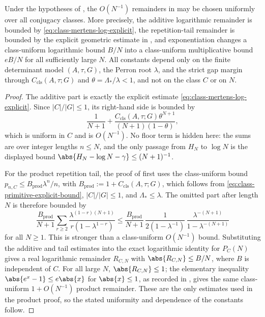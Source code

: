 \begin{proposition}
  \label{prop:main-ii-iii-uniform-remainders}
  Under the hypotheses of , the
  \(O(N^{-1})\) remainders in
   may be
  chosen uniformly over all conjugacy classes.  More precisely, the additive
  logarithmic remainder is bounded by
  \eqref{eq:class-mertens-log-explicit}, the repetition-tail remainder is
  bounded by the explicit geometric estimate in
  , and exponentiation changes a
  class-uniform logarithmic bound \(B/N\) into a class-uniform multiplicative
  bound \(eB/N\) for all sufficiently large \(N\).  All constants depend only
  on the finite determinant model \((A,\tau,G)\), the Perron root \(\lambda\),
  and the strict gap margin through \(C_{\mathrm{cls}}(A,\tau;G)\) and
  \(\theta=\Lambda_*/\lambda<1\), and not on the class \(C\) or on \(N\).
\end{proposition}

\begin{proof}
  The additive part is exactly the explicit estimate
  \eqref{eq:class-mertens-log-explicit}.  Since \(|C|/|G|\le1\), its right-hand
  side is bounded by
  \[
    \frac{1}{N+1}
    +
    \frac{C_{\mathrm{cls}}(A,\tau;G)\theta^{N+1}}
      {(N+1)(1-\theta)},
  \]
  which is uniform in \(C\) and is \(O(N^{-1})\).  No floor term is hidden here:
  the sums are over integer lengths \(n\le N\), and the only passage from
  \(H_N\) to \(\log N\) is the displayed bound
  \(\abs{H_N-\log N-\gamma}\le (N+1)^{-1}\).

  For the product repetition tail, the proof of
   first uses the class-uniform bound
  \(p_{n,C}\le B_{\mathrm{prod}}\lambda^n/n\), with
  \(B_{\mathrm{prod}}:=1+C_{\mathrm{cls}}(A,\tau;G)\), which follows from
  \eqref{eq:class-primitive-explicit-bound}, \(|C|/|G|\le1\), and
  \(\Lambda_*\le\lambda\).  The omitted part after length \(N\) is therefore
  bounded by
  \[
    \frac{B_{\mathrm{prod}}}{N+1}
    \sum_{r\ge2}\frac{\lambda^{(1-r)(N+1)}}{r(1-\lambda^{1-r})}
    \le
    \frac{B_{\mathrm{prod}}}{N+1}\,
    \frac{1}{2(1-
    \lambda^{-1})}\,
    \frac{\lambda^{-(N+1)}}{1-\lambda^{-(N+1)}}
  \]
  for all \(N\ge1\).  This is stronger than a class-uniform
  \(O(N^{-1})\) bound.  Substituting the additive and tail estimates into the
  exact logarithmic identity for \(P_C(N)\) gives a real logarithmic remainder
  \(R_{C,N}\) with \(\abs{R_{C,N}}\le B/N\), where \(B\) is independent of
  \(C\).  For all large \(N\), \(\abs{R_{C,N}}\le1\); the elementary inequality
  \(\abs{e^x-1}\le e\abs{x}\) for \(\abs{x}\le1\), as recorded in
  , gives the same
  class-uniform \(1+O(N^{-1})\) product remainder.  These are the only estimates
  used in the product proof, so the stated uniformity and dependence of the
  constants follow.
\end{proof}

